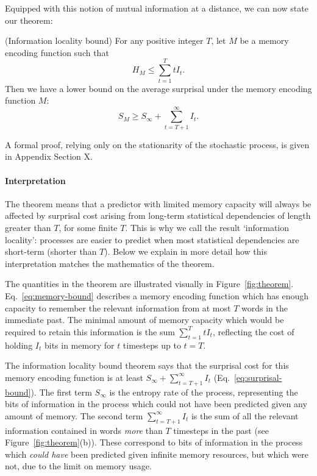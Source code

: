 Equipped with this notion of mutual information at a distance, we can now state our theorem:
\begin{thm}\label{prop:suboptimal}(Information locality bound)
For any positive integer $T$, let $M$ be a memory encoding function such that
\begin{equation}
\label{eq:memory-bound}
H_M \le \sum_{t=1}^T t I_t.    
\end{equation}
Then we have a lower bound on the average surprisal under the memory encoding function $M$:
\begin{equation}
\label{eq:surprisal-bound}
S_M \ge S_\infty + \sum_{t=T+1}^\infty I_t.
\end{equation}
\end{thm}
A formal proof, relying only on the stationarity of the stochastic process, is given in Appendix Section X. 

\paragraph{Interpretation} The theorem means that a predictor with limited memory capacity will always be affected by surprisal cost arising from long-term statistical dependencies of length greater than $T$, for some finite $T$. This is why we call the result `information locality': processes are easier to predict when most statistical dependencies are short-term (shorter than $T$). Below we explain in more detail how this interpretation matches the mathematics of the theorem.

The quantities in the theorem are illustrated visually in Figure~\ref{fig:theorem}. Eq.~\ref{eq:memory-bound} describes a memory encoding function which has enough capacity to remember the relevant information from at most $T$ words in the immediate past. The minimal amount of memory capacity which would be required to retain this information is the sum $\sum_{t=1}^T t I_t$, reflecting the cost of holding $I_t$ bits in memory for $t$ timesteps up to $t=T$. 

The information locality bound theorem says that the surprisal cost for this memory encoding function is at least $S_\infty + \sum_{t=T+1}^\infty I_t$ (Eq.~\ref{eq:surprisal-bound}). The first term $S_\infty$ is the entropy rate of the process, representing the bits of information in the process which could not have been predicted given any amount of memory. The second term $\sum_{t=T+1}^\infty I_t$ is the sum of all the relevant information contained in words \emph{more} than $T$ timesteps in the past (see Figure~\ref{fig:theorem}(b)). These correspond to bits of information in the process which \emph{could have} been predicted given infinite memory resources, but which were not, due to the limit on memory usage.

